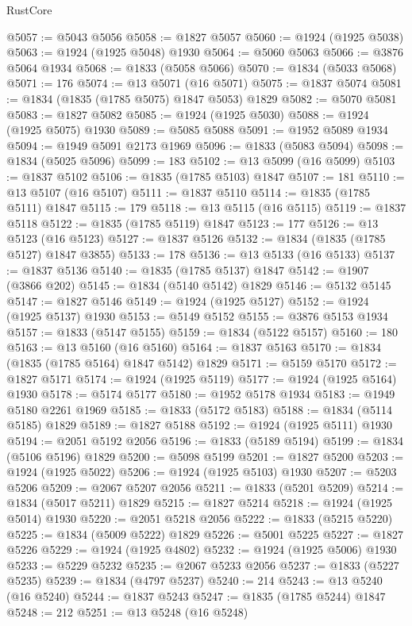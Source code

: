 \begin{lexlean}{RustCore}
\begin{coremodule}
@5057 := @5043 @5056
@5058 := @1827 @5057
@5060 := @1924 (@1925 @5038)
@5063 := @1924 (@1925 @5048) @1930
@5064 := @5060 @5063
@5066 := @3876 @5064 @1934
@5068 := @1833 (@5058 @5066)
@5070 := @1834 (@5033 @5068)
@5071 := 176
@5074 := @13 @5071 (@16 @5071)
@5075 := @1837 @5074
@5081 := @1834 (@1835 (@1785 @5075) @1847 @5053) @1829
@5082 := @5070 @5081
@5083 := @1827 @5082
@5085 := @1924 (@1925 @5030)
@5088 := @1924 (@1925 @5075) @1930
@5089 := @5085 @5088
@5091 := @1952 @5089 @1934
@5094 := @1949 @5091 @2173 @1969
@5096 := @1833 (@5083 @5094)
@5098 := @1834 (@5025 @5096)
@5099 := 183
@5102 := @13 @5099 (@16 @5099)
@5103 := @1837 @5102
@5106 := @1835 (@1785 @5103) @1847
@5107 := 181
@5110 := @13 @5107 (@16 @5107)
@5111 := @1837 @5110
@5114 := @1835 (@1785 @5111) @1847
@5115 := 179
@5118 := @13 @5115 (@16 @5115)
@5119 := @1837 @5118
@5122 := @1835 (@1785 @5119) @1847
@5123 := 177
@5126 := @13 @5123 (@16 @5123)
@5127 := @1837 @5126
@5132 := @1834 (@1835 (@1785 @5127) @1847 @3855)
@5133 := 178
@5136 := @13 @5133 (@16 @5133)
@5137 := @1837 @5136
@5140 := @1835 (@1785 @5137) @1847
@5142 := @1907 (@3866 @202)
@5145 := @1834 (@5140 @5142) @1829
@5146 := @5132 @5145
@5147 := @1827 @5146
@5149 := @1924 (@1925 @5127)
@5152 := @1924 (@1925 @5137) @1930
@5153 := @5149 @5152
@5155 := @3876 @5153 @1934
@5157 := @1833 (@5147 @5155)
@5159 := @1834 (@5122 @5157)
@5160 := 180
@5163 := @13 @5160 (@16 @5160)
@5164 := @1837 @5163
@5170 := @1834 (@1835 (@1785 @5164) @1847 @5142) @1829
@5171 := @5159 @5170
@5172 := @1827 @5171
@5174 := @1924 (@1925 @5119)
@5177 := @1924 (@1925 @5164) @1930
@5178 := @5174 @5177
@5180 := @1952 @5178 @1934
@5183 := @1949 @5180 @2261 @1969
@5185 := @1833 (@5172 @5183)
@5188 := @1834 (@5114 @5185) @1829
@5189 := @1827 @5188
@5192 := @1924 (@1925 @5111) @1930
@5194 := @2051 @5192 @2056
@5196 := @1833 (@5189 @5194)
@5199 := @1834 (@5106 @5196) @1829
@5200 := @5098 @5199
@5201 := @1827 @5200
@5203 := @1924 (@1925 @5022)
@5206 := @1924 (@1925 @5103) @1930
@5207 := @5203 @5206
@5209 := @2067 @5207 @2056
@5211 := @1833 (@5201 @5209)
@5214 := @1834 (@5017 @5211) @1829
@5215 := @1827 @5214
@5218 := @1924 (@1925 @5014) @1930
@5220 := @2051 @5218 @2056
@5222 := @1833 (@5215 @5220)
@5225 := @1834 (@5009 @5222) @1829
@5226 := @5001 @5225
@5227 := @1827 @5226
@5229 := @1924 (@1925 @4802)
@5232 := @1924 (@1925 @5006) @1930
@5233 := @5229 @5232
@5235 := @2067 @5233 @2056
@5237 := @1833 (@5227 @5235)
@5239 := @1834 (@4797 @5237)
@5240 := 214
@5243 := @13 @5240 (@16 @5240)
@5244 := @1837 @5243
@5247 := @1835 (@1785 @5244) @1847
@5248 := 212
@5251 := @13 @5248 (@16 @5248)

\end{coremodule}
\end{lexlean}
